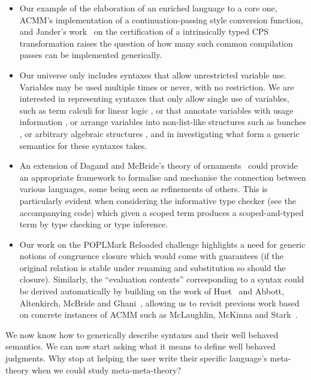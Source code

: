 \begin{itemize}
\item Our example of the elaboration of an enriched language to a core
  one, ACMM's implementation of a continuation-passing style
  conversion function, and Jander's work~\citeyear{Jander:Thesis:2019}
  on the certification of a intrinsically typed CPS transformation
  raises the question of how many such common compilation passes can
  be implemented generically.
\item Our universe only includes syntaxes that allow unrestricted
  variable use. Variables may be used multiple times or never, with no
  restriction. We are interested in representing syntaxes that only
  allow single use of variables, such as term calculi for linear logic
  \cite{DBLP:conf/tlca/BentonBPH93,barber96dual,context-constrained},
  or that annotate variables with usage information
  \cite{BrunelGMZ14,GhicaS14,PetricekOM14}, or arrange variables into
  non-list-like structures such as bunches
  \cite{DBLP:journals/jfp/OHearn03}, or arbitrary algebraic structures
  \cite{DBLP:conf/rta/LicataSR17}, and in investigating what form a
  generic semantics for these syntaxes takes.
\item An extension of Dagand and McBride's theory of
  ornaments~\citeyear{DBLP:journals/jfp/DagandM14} could provide an
  appropriate framework to formalise and mechanise the connection
  between various languages, some being seen as refinements of
  others. This is particularly evident when considering the
  informative type checker (see the accompanying code) which given a
  scoped term produces a scoped-and-typed term by type checking or
  type inference.
\item Our work on the POPLMark Reloaded challenge highlights a need
  for generic notions of congruence closure which would come with
  guarantees (if the original relation is stable under renaming and
  substitution so should the closure).  Similarly, the ``evaluation
  contexts'' corresponding to a syntax could be derived automatically
  by building on the work of Huet~\citeyear{huet_1997} and Abbott,
  Altenkirch, McBride and
  Ghani~\citeyear{DBLP:journals/fuin/AbbottAMG05}, allowing us to
  revisit previous work based on concrete instances of ACMM such as
  McLaughlin, McKinna and Stark~\citeyear{craig2018triangle}.
\end{itemize}

We now know how to generically describe syntaxes and their well
behaved semantics. We can now start asking what it means to define
well behaved judgments. Why stop at helping the user write their
specific language's meta-theory when we could study meta-meta-theory?
